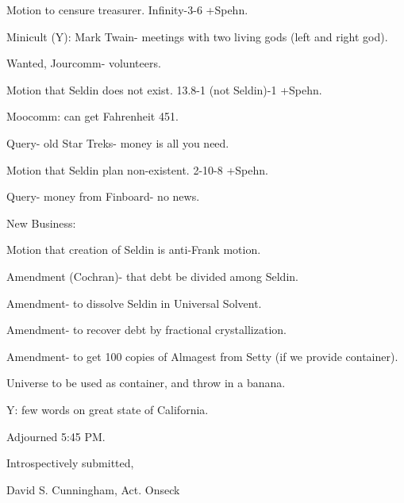 \documentclass[12pt]{article}
\begin{document}
Motion to censure treasurer. Infinity-3-6 +Spehn.

Minicult (Y): Mark Twain- meetings with two living gods (left and right god).

Wanted, Jourcomm- volunteers.

Motion that Seldin does not exist. 13.8-1 (not Seldin)-1 +Spehn.

Moocomm: can get Fahrenheit 451.

Query- old Star Treks- money is all you need.

Motion that Seldin plan non-existent. 2-10-8 +Spehn.

Query- money from Finboard- no news.

New Business:

Motion that creation of Seldin is anti-Frank motion.

Amendment (Cochran)- that debt be divided among Seldin.

Amendment- to dissolve Seldin in Universal Solvent.

Amendment- to recover debt by fractional crystallization.

Amendment- to get 100 copies of Almagest from Setty (if we provide container).

Universe to be used as container, and throw in a banana.

Y: few words on great state of California.

Adjourned 5:45 PM.

\vspace{12pt}

\centerline{Introspectively submitted,}
\centerline{David S. Cunningham, Act. Onseck}
\end{document}
